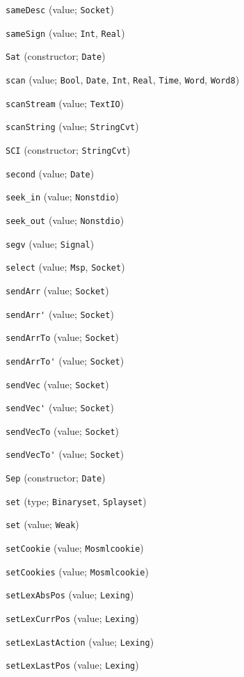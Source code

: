\begin{description}
\item[] \verb"sameDesc" (value; \verb"Socket")
\item[] \verb"sameSign" (value; \verb"Int", \verb"Real")
\item[] \verb"Sat" (constructor; \verb"Date")
\item[] \verb"scan" (value; \verb"Bool", \verb"Date", \verb"Int", \verb"Real", \verb"Time", \verb"Word", \verb"Word8")
\item[] \verb"scanStream" (value; \verb"TextIO")
\item[] \verb"scanString" (value; \verb"StringCvt")
\item[] \verb"SCI" (constructor; \verb"StringCvt")
\item[] \verb"second" (value; \verb"Date")
\item[] \verb"seek_in" (value; \verb"Nonstdio")
\item[] \verb"seek_out" (value; \verb"Nonstdio")
\item[] \verb"segv" (value; \verb"Signal")
\item[] \verb"select" (value; \verb"Msp", \verb"Socket")
\item[] \verb"sendArr" (value; \verb"Socket")
\item[] \verb"sendArr'" (value; \verb"Socket")
\item[] \verb"sendArrTo" (value; \verb"Socket")
\item[] \verb"sendArrTo'" (value; \verb"Socket")
\item[] \verb"sendVec" (value; \verb"Socket")
\item[] \verb"sendVec'" (value; \verb"Socket")
\item[] \verb"sendVecTo" (value; \verb"Socket")
\item[] \verb"sendVecTo'" (value; \verb"Socket")
\item[] \verb"Sep" (constructor; \verb"Date")
\item[] \verb"set" (type; \verb"Binaryset", \verb"Splayset")
\item[] \verb"set" (value; \verb"Weak")
\item[] \verb"setCookie" (value; \verb"Mosmlcookie")
\item[] \verb"setCookies" (value; \verb"Mosmlcookie")
\item[] \verb"setLexAbsPos" (value; \verb"Lexing")
\item[] \verb"setLexCurrPos" (value; \verb"Lexing")
\item[] \verb"setLexLastAction" (value; \verb"Lexing")
\item[] \verb"setLexLastPos" (value; \verb"Lexing")

\end{description}
